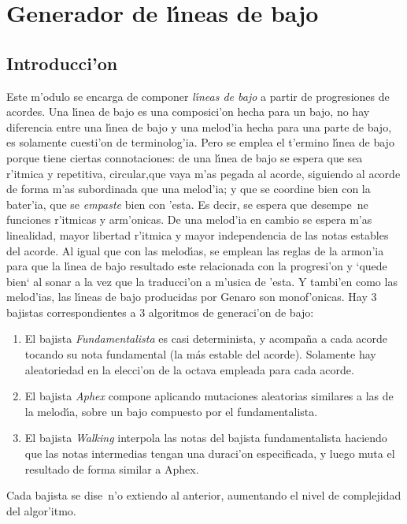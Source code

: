 ﻿\chapter{Generador de l\'\i neas de bajo}
\section{Introducci'on}
Este m'odulo se encarga de componer \emph{l\'\i neas de bajo} a partir de progresiones de acordes. Una l\'\i nea de bajo es una composici'on hecha para un bajo, no hay diferencia entre una l\'\i nea de bajo y una melod'ia hecha para una parte de bajo, es solamente cuesti'on de terminolog'ia. Pero se emplea el t'ermino l\'\i nea de bajo porque tiene ciertas connotaciones: de una l\'\i nea de bajo se espera que sea r'itmica y repetitiva, circular,que vaya m'as pegada al acorde, siguiendo al acorde de forma m'as subordinada que una melod'ia; y que se coordine bien con la bater'ia, que se \emph{empaste} bien con 'esta. Es decir, se espera que desempe~ne funciones r'itmicas y arm'onicas. De una melod'ia en cambio se espera m'as linealidad, mayor libertad r'itmica y mayor independencia de las notas estables del acorde.\newline
Al igual que con las melod\'\i as, se emplean las reglas de la armon'ia para que la l\'\i nea de bajo resultado este relacionada con la progresi'on y `quede bien` al sonar a la vez que la traducci'on a m'usica de 'esta. Y tambi'en como las melod'ias, las l\'\i neas de bajo producidas por Genaro son monof'onicas.\newline
Hay 3 bajistas correspondientes a 3 algoritmos de generaci'on de bajo: 
        \begin{enumerate}
        \item El bajista \emph{Fundamentalista} es casi determinista, y acompa\~na a cada acorde tocando su nota fundamental (la más estable del acorde). Solamente hay aleatoriedad en la elecci'on de la octava empleada para cada acorde.
        \item El bajista \emph{Aphex} compone aplicando mutaciones aleatorias similares a las de la melod\'\i a, sobre un bajo compuesto por el fundamentalista.
        \item El bajista \emph{Walking} interpola las notas del bajista fundamentalista haciendo que las notas intermedias tengan una duraci'on especificada, y luego muta el resultado de forma similar a Aphex.
        \end{enumerate}
Cada bajista se dise~n'o extiendo al anterior, aumentando el nivel de complejidad del algor'itmo.
	
